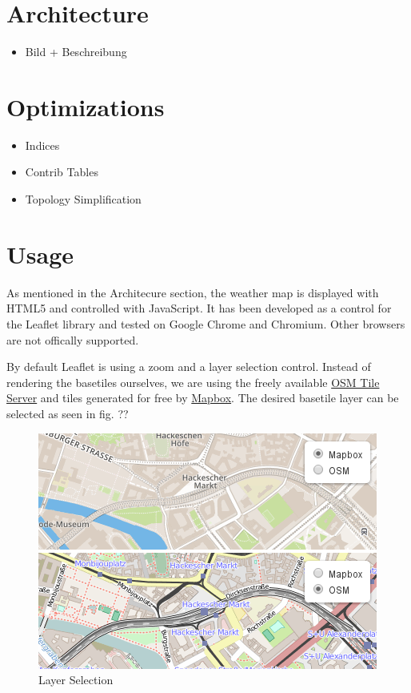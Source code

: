 \section{Architecture}\label{architecture}

\begin{itemize}
\itemsep1pt\parskip0pt
\item
  Bild + Beschreibung
\end{itemize}

\section{Optimizations}\label{optimizations}

\begin{itemize}
\itemsep1pt\parskip0pt
\item
  Indices
\item
  Contrib Tables
\item
  Topology Simplification
\end{itemize}

\section{Usage}\label{usage}

As mentioned in the Architecure section, the weather map is displayed
with HTML5 and controlled with JavaScript. It has been developed as a
control for the Leaflet library and tested on Google Chrome and
Chromium. Other browsers are not offically supported.

By default Leaflet is using a zoom and a layer selection control.
Instead of rendering the basetiles ourselves, we are using the freely
available
\href{http://wiki.openstreetmap.org/wiki/Tile_usage_policy}{OSM Tile
Server} and tiles generated for free by
\href{https://www.mapbox.com/}{Mapbox}. The desired basetile layer can
be selected as seen in fig. ??

\begin{figure}[htbp]
\centering
\includegraphics{pictures/screenshot-baselayer.png}
\caption{Layer Selection}
\end{figure}

